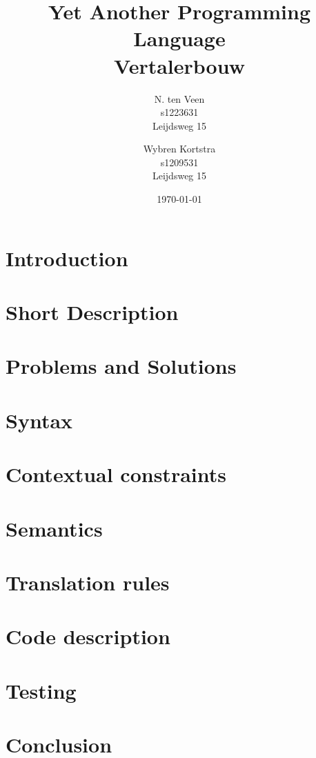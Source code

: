 \documentclass[a4paper]{report}
\title{
	Yet Another Programming Language \\
	{\large Vertalerbouw }
}
\author{
	N. ten Veen \\
    s1223631 \\
    Leijdsweg 15
	\and
    Wybren Kortstra \\
    s1209531 \\
    Leijdsweg 15
}
\date{\today}
\begin{document}
\maketitle

\tableofcontents \pagebreak

\chapter{Introduction}



\chapter{Short Description}


\chapter{Problems and Solutions}


\chapter{Syntax}



\chapter{Contextual constraints}


\chapter{Semantics}

\chapter{Translation rules}

\chapter{Code description}

\chapter{Testing}

\chapter{Conclusion}

\end{document}
